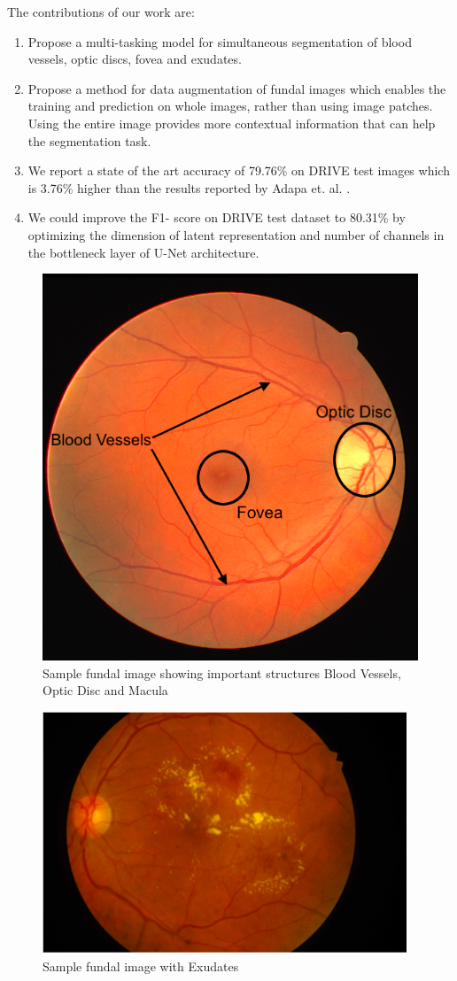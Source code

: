 \documentclass{article}
\begin{document}
The contributions of our work are:
\begin{enumerate}
\item Propose a multi-tasking model for simultaneous segmentation of blood vessels, optic discs, fovea and exudates.
\item Propose a method for data augmentation of fundal images which enables the training and prediction on whole images, rather than using image patches.
Using the entire image provides more contextual information that can help the segmentation task.
\item We report a state of the art accuracy of 79.76\% on DRIVE test images which is 3.76\% higher than the results reported by Adapa et. al. \cite{adapa2020supervised}.
\item We could improve the F1- score on DRIVE test dataset to  80.31\% by optimizing the dimension of latent representation and number of channels in the bottleneck layer of U-Net architecture.

\end{enumerate}

\begin{figure}[!ht]
\centering
\includegraphics[width=0.5\linewidth]{images/eye_1.png}
\caption{Sample fundal image showing important structures Blood Vessels, Optic Disc and Macula}
\label{sample_funal_image}
\end{figure}

\begin{figure}[!ht]
\centering
\includegraphics[width=0.5\linewidth]{images/Exudates_Image.png}
\caption{Sample fundal image with Exudates}
\label{fundal_image_exudates}
\end{figure}
\end{document}
